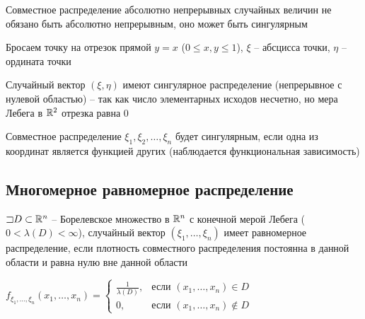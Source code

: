 \documentclass[12pt]{article}
\begin{document}
    \Nota Совместное распределение абсолютно непрерывных случайных величин не обязано быть абсолютно непрерывным, оно может быть сингулярным

    \Exs Бросаем точку на отрезок прямой $y = x$ ($0 \leq x, y \leq 1$), $\xi$ -- абсцисса точки, $\eta$ -- ордината точки

    Случайный вектор $(\xi, \eta)$ имеют сингулярное распределение (непрерывное с нулевой областью) -- 
    так как число элементарных исходов несчетно, но мера Лебега в $\mathbb{R}^2$ отрезка равна 0

    \Nota Совместное распределение $\xi_1, \xi_2, \dots, \xi_n$ будет сингулярным, если одна из координат является функцией других (наблюдается функциональная зависимость)

    \subsection{Многомерное равномерное распределение}

    \Def $\mathord{\sqsupset} D \subset \mathbb{R}^n$ -- Борелевское множество в $\mathbb{R}^n$ с конечной мерой Лебега ($0 < \lambda(D) < \infty$),
    случайный вектор $(\xi_1, \dots, \xi_n)$ имеет равномерное распределение, если плотность совместного распределения 
    постоянна в данной области и равна нулю вне данной области

    $f_{\xi_1, \dots, \xi_n}(x_1, \dots, x_n) = \begin{cases}\frac{1}{\lambda(D)}, & \text{если } (x_1, \dots, x_n) \in D \\ 0, & \text{если } (x_1, \dots, x_n) \not\in D\end{cases}$
\end{document}
